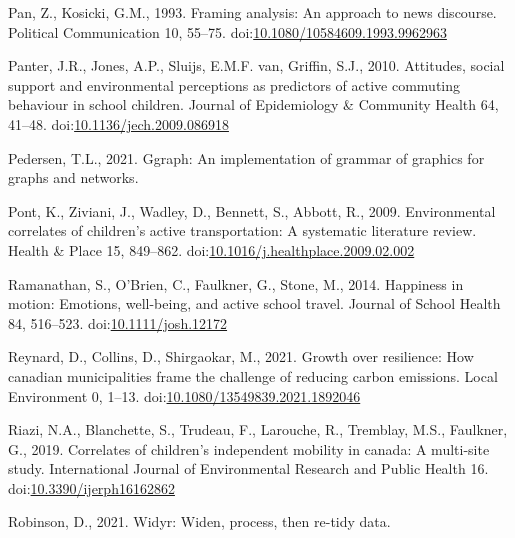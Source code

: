 \documentclass[]{elsarticle} %
\newlength{\cslhangindent}
\newlength{\cslentryspacingunit} %
\newenvironment{CSLReferences}[2] %
 {%
  \setlength{\parindent}{0pt}
  \ifodd #1
  \let\oldpar\par
  \def\par{\hangindent=\cslhangindent\oldpar}
  \fi
  \setlength{\parskip}{#2\cslentryspacingunit}
 }%
 {}
\begin{document}
\begin{CSLReferences}{1}{0}
\leavevmode{}%
Pan, Z., Kosicki, G.M., 1993. Framing analysis: An approach to news
discourse. Political Communication 10, 55--75.
doi:\href{https://doi.org/10.1080/10584609.1993.9962963}{10.1080/10584609.1993.9962963}

\leavevmode{}%
Panter, J.R., Jones, A.P., Sluijs, E.M.F. van, Griffin, S.J., 2010.
Attitudes, social support and environmental perceptions as predictors of
active commuting behaviour in school children. Journal of Epidemiology
\& Community Health 64, 41--48.
doi:\href{https://doi.org/10.1136/jech.2009.086918}{10.1136/jech.2009.086918}

\leavevmode{}%
Pedersen, T.L., 2021. Ggraph: An implementation of grammar of graphics
for graphs and networks.

\leavevmode{}%
Pont, K., Ziviani, J., Wadley, D., Bennett, S., Abbott, R., 2009.
Environmental correlates of children's active transportation: A
systematic literature review. Health \& Place 15, 849--862.
doi:\href{https://doi.org/10.1016/j.healthplace.2009.02.002}{10.1016/j.healthplace.2009.02.002}

\leavevmode{}%
Ramanathan, S., O'Brien, C., Faulkner, G., Stone, M., 2014. Happiness in
motion: Emotions, well-being, and active school travel. Journal of
School Health 84, 516--523.
doi:\href{https://doi.org/10.1111/josh.12172}{10.1111/josh.12172}

\leavevmode{}%
Reynard, D., Collins, D., Shirgaokar, M., 2021. Growth over resilience:
How canadian municipalities frame the challenge of reducing carbon
emissions. Local Environment 0, 1--13.
doi:\href{https://doi.org/10.1080/13549839.2021.1892046}{10.1080/13549839.2021.1892046}

\leavevmode{}%
Riazi, N.A., Blanchette, S., Trudeau, F., Larouche, R., Tremblay, M.S.,
Faulkner, G., 2019. Correlates of children's independent mobility in
canada: A multi-site study. International Journal of Environmental
Research and Public Health 16.
doi:\href{https://doi.org/10.3390/ijerph16162862}{10.3390/ijerph16162862}

\leavevmode{}%
Robinson, D., 2021. Widyr: Widen, process, then re-tidy data.


\end{CSLReferences}
\end{document}
